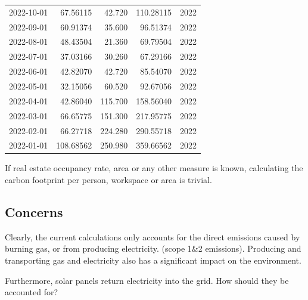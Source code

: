\documentclass[
  letterpaper,
  DIV=11,
  numbers=noendperiod]{scrartcl}
\begin{document}
\begin{longtable}[]{@{}lrrrl@{}}
2022-10-01 & 67.56115 & 42.720 & 110.28115 & 2022 \\
2022-09-01 & 60.91374 & 35.600 & 96.51374 & 2022 \\
2022-08-01 & 48.43504 & 21.360 & 69.79504 & 2022 \\
2022-07-01 & 37.03166 & 30.260 & 67.29166 & 2022 \\
2022-06-01 & 42.82070 & 42.720 & 85.54070 & 2022 \\
2022-05-01 & 32.15056 & 60.520 & 92.67056 & 2022 \\
2022-04-01 & 42.86040 & 115.700 & 158.56040 & 2022 \\
2022-03-01 & 66.65775 & 151.300 & 217.95775 & 2022 \\
2022-02-01 & 66.27718 & 224.280 & 290.55718 & 2022 \\
2022-01-01 & 108.68562 & 250.980 & 359.66562 & 2022 \\
\end{longtable}

If real estate occupancy rate, area or any other measure is known,
calculating the carbon footprint per person, workspace or area is
trivial.

\subsection{Concerns}\label{concerns}

Clearly, the current calculations only accounts for the direct emissions
caused by burning gas, or from producing electricity. (scope 1\&2
emissions). Producing and transporting gas and electricity also has a
significant impact on the environment.

Furthermore, solar panels return electricity into the grid. How should
they be accounted for?
\end{document}
